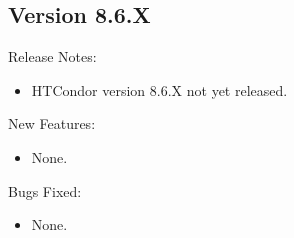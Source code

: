 \subsection*{\label{sec:New-8-6-X}Version 8.6.X}

\noindent Release Notes:

\begin{itemize}

\item HTCondor version 8.6.X not yet released.

\end{itemize}


\noindent New Features:

\begin{itemize}

\item None.

\end{itemize}

\noindent Bugs Fixed:

\begin{itemize}

\item None.

\end{itemize}

